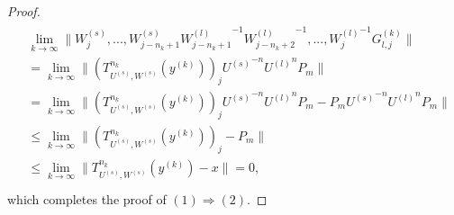 \documentclass{article}
\begin{document}
\begin{proof}
\begin{eqnarray}\begin{split}\nonumber
&\lim_{k\rightarrow\infty}\|W^{(s)}_{j},...,W^{(s)}_{j-n_{k}+1}{W^{(l)}_{j-n_{k}+1}}^{-1}{W^{(l)}_{j-n_{k}+2}}^{-1},...,
{W^{(l)}_{j}}^{-1}G^{(k)}_{l,j}\|\\
&=\lim_{k\rightarrow\infty}\|\left(T^{n_{k}}_{U^{(s)},W^{(s)}}(y^{(k)})\right)_{j} {U^{(s)}}^{-n}{U^{(l)}}^{n}P_{m}\|\\
&=\lim_{k\rightarrow\infty}\|\left(T^{n_{k}}_{U^{(s)},W^{(s)}}(y^{(k)})\right)_{j} {U^{(s)}}^{-n}{U^{(l)}}^{n}P_{m}-P_{m}{U^{(s)}}^{-n}{U^{(l)}}^{n}P_{m}\|\\
&\leq\lim_{k\rightarrow\infty}\|\left(T^{n_{k}}_{U^{(s)},W^{(s)}}(y^{(k)})\right)_{j}-P_{m}\|\\
&\leq \lim_{k\rightarrow\infty}\|T^{n_{k}}_{U^{(s)},W^{(s)}}(y^{(k)})-x\|=0,\\
\end{split}\end{eqnarray}
which completes the proof of $(1)\Rightarrow(2)$.


\end{proof}
\end{document}

